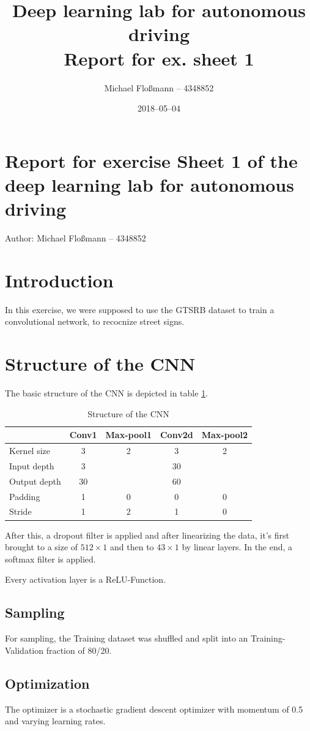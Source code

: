 \documentclass[10pt, a4paper]{scrartcl}
\title{Deep learning lab for autonomous driving \\ Report for ex. sheet 1}
\author{Michael Floßmann -- 4348852}
\date{2018--05--04}
\begin{document}

\section{Report for exercise Sheet 1 of the deep learning lab for autonomous driving}
Author: Michael Floßmann -- 4348852
\section{Introduction}
In this exercise, we were supposed to use the GTSRB dataset to train a
convolutional network, to recocnize street signs.

\section{Structure of the CNN}
The basic structure of the CNN is depicted in table \ref{tab:net}.
\begin{table}[!htbp]
  \centering
  \begin{tabular}{lcccc}
    &Conv1&Max-pool1&Conv2d&Max-pool2\\ \hline
    Kernel size & 3 & 2 & 3 & 2 \\
    Input depth & 3 & & 30 & \\
    Output depth & 30 & & 60 & \\
    Padding & 1 & 0 & 0 & 0 \\
    Stride & 1 & 2 & 1 & 0 \\
  \end{tabular}
  \label{tab:net}
  \caption{Structure of the CNN}
\end{table}

After this, a dropout filter is applied and after linearizing the data, it's
first brought to a size of $512\times 1$ and then to $43\times 1$ by linear
layers. In the end, a softmax filter is applied.

Every activation layer is a ReLU-Function.

\subsection{Sampling}
For sampling, the Training dataset was shuffled and split into an
Training-Validation fraction of 80/20.

\subsection{Optimization}
The optimizer is a stochastic gradient descent optimizer with momentum of 0.5
and varying learning rates.
\end{document}
